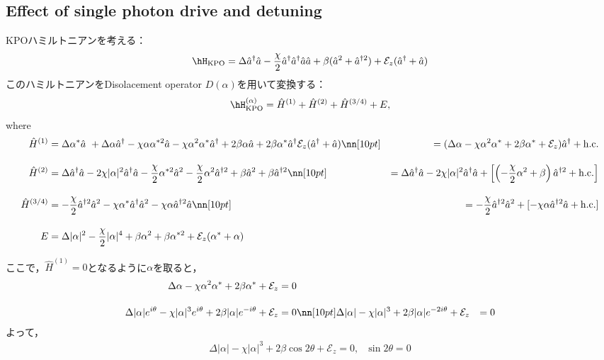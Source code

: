 \subsection{Effect of single photon drive and detuning}
KPOハミルトニアンを考える：
\begin{equation}
    \hH_{\rm{KPO}}=\Delta \hat{a}^\dagger\hat{a} - \frac{\chi}{2}
    \hat{a}^\dagger\hat{a}^\dagger\hat{a}\hat{a} + \beta (\hat{a}^2 + \hat{a}^{\dagger 2})
    +\mathcal{E}_z (\hat{a}^{\dagger} + \hat{a})
\end{equation}
このハミルトニアンをDisolacement operator $D(\alpha)$を用いて変換する：
\begin{equation}
    \hH_{\rm{KPO}}^{(\alpha)}=\hat{H}^{(1)} + \hat{H}^{(2)} + \hat{H}^{(3/4)} + E,
\end{equation}
where
\begin{align}
    \hat{H}^{(1)}&=
    \Delta\alpha^{\ast}\hat{a}\ + \Delta\alpha\hat{a}^{\dagger}
    - \chi\alpha\alpha^{\ast2}\hat{a}
    - \chi\alpha^2\alpha^{\ast}\hat{a}^{\dagger}
    +2\beta\alpha\hat{a}
    + 2\beta\alpha^{\ast}\hat{a}^{\dagger}
    \mathcal{E}_z (\hat{a}^{\dagger} + \hat{a})
    \nn[10pt]
    &=
    (\Delta\alpha
    - \chi\alpha^2\alpha^{\ast}
    + 2\beta\alpha^{\ast}+\mathcal{E}_z
    )\hat{a}^{\dagger}
    +{\rm{h.c.}}
    \\[10pt]
    \hat{H}^{(2)}
    &=\Delta\hat{a}^{\dagger}\hat{a} 
    - 2\chi|\alpha|^2\hat{a}^{\dagger}\hat{a}- \frac{\chi}{2}\alpha^{\ast2}\hat{a}^2
    - \frac{\chi}{2}\alpha^2\hat{a}^{\dagger2}
    +\beta\hat{a}^2+\beta\hat{a}^{\dagger2}
    \nn[10pt]
    &=\Delta\hat{a}^{\dagger}\hat{a} 
    - 2\chi|\alpha|^2\hat{a}^{\dagger}\hat{a}
    +\left[\left(- \frac{\chi}{2}\alpha^2
    +\beta\right)\hat{a}^{\dagger2}
    +{\rm{h.c.}}\right]
    \\[10pt]
    \hat{H}^{(3/4)}&=
    - \frac{\chi}{2}\hat{a}^{\dagger2}\hat{a}^2 
    - \chi\alpha^{\ast}\hat{a}^{\dagger}\hat{a}^2
    - \chi\alpha\hat{a}^{\dagger2}\hat{a} 
    \nn[10pt]
    &=
    - \frac{\chi}{2}\hat{a}^{\dagger2}\hat{a}^2 
    +[- \chi\alpha\hat{a}^{\dagger2}\hat{a} +{\rm{h.c.}}]
    \\[10pt]
    E&=\Delta|\alpha|^2- \frac{\chi}{2}|\alpha|^4+\beta\alpha^2 
    +\beta\alpha^{\ast2}
    +\mathcal{E}_z (\alpha^{\ast} + \alpha)
\end{align}

ここで，$\hat{H}^{(1)}=0$となるように$\alpha$を取ると，
\begin{align}
    \Delta\alpha - \chi\alpha^2\alpha^{\ast} + 2\beta\alpha^{\ast} +\mathcal{E}_z &= 0\\[10pt]
    \Delta|\alpha|e^{i\theta} - \chi|\alpha|^3e^{i\theta} + 2\beta|\alpha|e^{-i\theta}+\mathcal{E}_z  &= 0
    \nn[10pt]
    \Delta|\alpha| - \chi|\alpha|^3 + 2\beta |\alpha| e^{-2i\theta}+\mathcal{E}_z&= 0
\end{align}
よって，
\begin{align}
    \Delta|\alpha| - \chi|\alpha|^3
    +2\beta\cos{2\theta}+\mathcal{E}_z=0,\ \ \ \sin{2\theta}= 0
\end{align}

